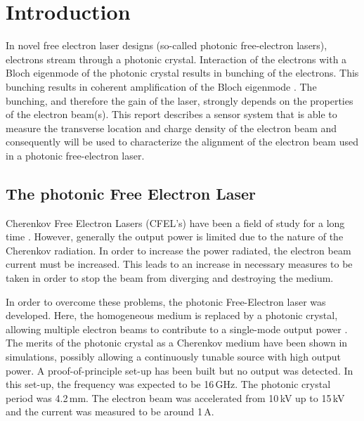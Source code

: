 \chapter{Introduction}
\label{sec:introduction}
% 
In novel free electron laser designs (so-called photonic free-electron lasers), electrons stream through a photonic crystal. Interaction of the electrons with a Bloch eigenmode of the photonic crystal results in bunching of the electrons. This bunching results in coherent amplification of the Bloch eigenmode \cite{Denis}.
The bunching, and therefore the gain of the laser, strongly depends on the properties of the electron beam(s).
This report describes a sensor system that is able to measure the transverse location and charge density of the electron beam and consequently will be used to characterize the alignment of the electron beam used in a photonic free-electron laser.
%

\section{The photonic Free Electron Laser}
Cherenkov Free Electron Lasers (CFEL's) have been a field of study for a long time . However, generally the output power is limited due to the nature of the Cherenkov radiation.
In order to increase the power radiated, the electron beam current must be increased. This leads to an increase in necessary measures to be taken in order to stop the beam from diverging and destroying the medium.

In order to overcome these problems, the photonic Free-Electron laser was developed. Here, the homogeneous medium is replaced by a photonic crystal, allowing multiple electron beams to contribute to a single-mode output power \cite{DenisMultiBeam}.
The merits of the photonic crystal as a Cherenkov medium have been shown in simulations, possibly allowing a continuously tunable source with high output power.
A proof-of-principle set-up has been built \cite{Denis} but no output was detected. In this set-up, the frequency was expected to be 16\,GHz. The photonic crystal period was 4.2\,mm. The electron beam was accelerated from 10\,kV up to 15\,kV and the current was measured to be around 1\,A.

